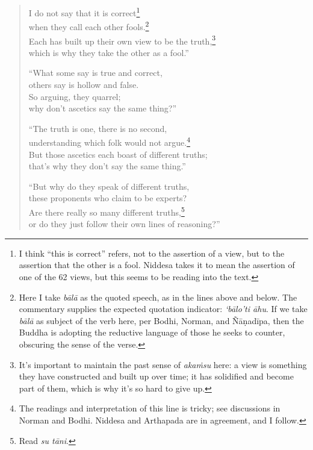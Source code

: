 \documentclass[12pt,openany]{book}%
\begin{document}
\begin{verse}
I do not say that it is correct\footnote{I think “this is correct” refers, not to the assertion of a view, but to the assertion that the other is a fool. Niddesa takes it to mean the assertion of one of the 62 views, but this seems to be reading into the text. } \\
when they call each other fools.\footnote{Here I take \textit{\textsanskrit{bālā}} as the quoted speech, as in the lines above and below. The commentary supplies the expected quotation indicator: \textit{‘\textsanskrit{bālo}’ti \textsanskrit{āhu}}. If we take \textit{\textsanskrit{bālā}} as subject of the verb here, per Bodhi, Norman, and \textsanskrit{Ñāṇadīpa}, then the Buddha is adopting the reductive language of those he seeks to counter, obscuring the sense of the verse. } \\
Each has built up their own view to be the truth,\footnote{It’s important to maintain the past sense of \textit{\textsanskrit{akaṁsu}} here: a view is something they have constructed and built up over time; it has solidified and become part of them, which is why it’s so hard to give up. } \\
which is why they take the other as a fool.” 

“What some say is true and correct, \\
others say is hollow and false. \\
So arguing, they quarrel; \\
why don’t ascetics say the same thing?” 

“The truth is one, there is no second, \\
understanding which folk would not argue.\footnote{The readings and interpretation of this line is tricky; see discussions in Norman and Bodhi. Niddesa and Arthapada are in agreement, and I follow. } \\
But those ascetics each boast of different truths; \\
that’s why they don’t say the same thing.” 

“But why do they speak of different truths, \\
these proponents who claim to be experts? \\
Are there really so many different truths,\footnote{Read \textit{su \textsanskrit{tāni}}. } \\
or do they just follow their own lines of reasoning?” 


\end{verse}
\end{document}
